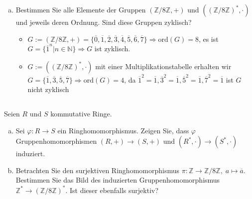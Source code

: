 \documentclass{article}
\newcommand{\N}{\mathbb{N}}
\newcommand{\Z}{\mathbb{Z}}
\newcommand{\ord}{\text{ord}}
\begin{document}
\begin{enumerate}[(a)]
\begin{itemize}
\begin{itemize}
                        dies ist ein Widerspruch zur Annahme $\Rightarrow$ Jedes ELement hat ein Inverses in $G$.
                \end{itemize}
            \item
                Sei z.B. $R=\Z/3\Z$, so ist $0^{-1}\notin \Z/3\Z$, da kein Inverses zur Multiplikation gefordert wird.
        \end{itemize}
    \item
        \color{blue}
        Bestimmen Sie alle Elemente der Gruppen $(\Z/8\Z,+)$ und
        $((\Z/8\Z)^*,\cdot)$ und jeweils deren Ordnung.
        Sind diese Gruppen zyklisch?
        \color{black}
        \begin{itemize}
            \item
                $G:=(\Z/8\Z,+)=\{\overline{0},\overline{1},\overline{2},\overline{3},\overline{4},\overline{5},\overline{6},
                \overline{7}\}\Rightarrow\ord(G)=8$, es ist $G=\{\overline{1}^n|n\in\N\}\Rightarrow G$ ist zyklisch.
            \item
                $G:=((\Z/8\Z)^*,\cdot)$ mit einer Multiplikationstabelle erhalten wir
                $G=\{\overline{1},\overline{3},\overline{5},\overline{7}\}\Rightarrow \ord(G)=4$, da
                $\overline{1}^2=\overline{1},\overline{3}^2=\overline{1},
                \overline{5}^2=\overline{1},\overline{7}^2=\overline{1}$ ist $G$ nicht zyklisch
        \end{itemize}
\end{enumerate}
\subsection{}
\color{blue}
Seien $R$ und $S$ kommutative Ringe.
\color{black}
\begin{enumerate}[(a)]
    \item
        \color{blue}
        Sei $\varphi\colon R \to S$ ein Ringhomomorphismus. Zeigen Sie, dass
        $\varphi$ Gruppenhomomorphismen $(R,+) \longrightarrow (S,+)$ und
        $(R^*,\cdot) \longrightarrow (S^*,\cdot)$ induziert.
        \color{black}
    \item
        \color{blue}
        Betrachten Sie den surjektiven Ringhomomorphismus
        $\pi\colon \Z \longrightarrow \Z/8\Z,\; a \longmapsto \overline{a}$.
        Bestimmen Sie das Bild des induzierten Gruppenhomomorphismus
        $\Z^* \longrightarrow (\Z/8\Z)^*$. Ist dieser ebenfalls surjektiv?
        \color{black}
\end{enumerate}
\end{document}
